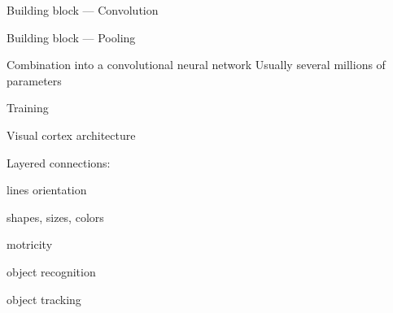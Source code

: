 \begin{frame}{Building block --- Convolution}
\end{frame}

\begin{frame}{Building block --- Pooling}
\end{frame}

\begin{frame}{Combination into a convolutional neural network}
  Usually several millions of parameters
\end{frame}

\begin{frame}{Training}
\end{frame}

\begin{frame}{Visual cortex architecture}
  \begin{minipage}[l]{0.50\linewidth}
  \end{minipage}\hfill
  \begin{minipage}[l]{0.49\linewidth}
    Layered connections:
    \begin{description}[<+(1)->]
    \item[V1] lines orientation
    \item[V2] shapes, sizes, colors
    \item[V3] motricity
    \item[V4] object recognition
    \item[V5] object tracking
    \end{description}
  \end{minipage}\hfill
\end{frame}

